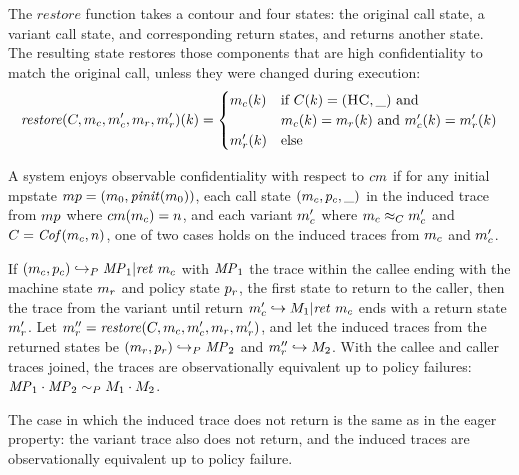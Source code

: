 \documentclass[acmsmall,review,anonymous]{acmart}\settopmatter{printfolios=true,printccs=false,printacmref=false}
\begin{document}
      The \(\mathit{restore}\) function takes a contour and four states: the
      original call state, a variant call state, and corresponding return
      states, and returns another state. The resulting state restores those
      components that are high confidentiality to match the original call,
      unless they were changed during execution:
      \[\mathit{restore}(C,m_c,m_c',m_r,m_r')(k) =
        \begin{cases}
          m_c(k) & \text{if } C(k) = (\textsc{HC},\_) \text{ and } \\
                  & m_c(k) = m_r(k) \text{ and }
                    m_c'(k) = m_r'(k) \\
          m_r'(k) & \text{else} \\
        \end{cases}\]

      A system enjoys observable confidentiality with respect to \(cm\)
      if for any initial mpstate \(mp =
      (m_0,\mathit{pinit}(m_0))\), each call state
      \((m_c,p_c,\_)\) in the induced trace from
      \(mp\) where \(cm(m_c) = n\), and each variant
      \(m_c'\) where \(m_c \approx_C m_c'\) and
      \(C = \mathit{Cof}(m_c, n)\), one of two cases holds on the
      induced traces from \(m_c\) and \(m_c'\).

      If \((m_c,p_c) \hookrightarrow_P \mathit{MP}_1 | \mathit{ret}\ m_c\)
      with \(\mathit{MP}_1\) the trace within the callee ending with the machine state
      \(m_r\) and policy state \(p_r\), the first state to return to the
      caller, then the trace from the variant until return 
      \(m_c' \hookrightarrow M_1 | \mathit{ret}\ m_c\) ends with a return
      state \(m_r'\). Let \(m_r'' = \mathit{restore}(C,m_c,
      m_c',m_r,m_r')\), and let the induced traces from the
      returned states be \((m_r,p_r) \hookrightarrow_P \mathit{MP}_2\)
      and \(m_r'' \hookrightarrow M_2\). With the callee and caller
      traces joined, the traces are observationally equivalent up to policy
      failures: \(\mathit{MP}_1 \cdot \mathit{MP}_2 \sim_P M_1 \cdot M_2\).

      The case in which the induced trace does not return is the same as in the
      eager property: the variant trace also does not return, and the induced
      traces are observationally equivalent up to policy failure.
\end{document}
